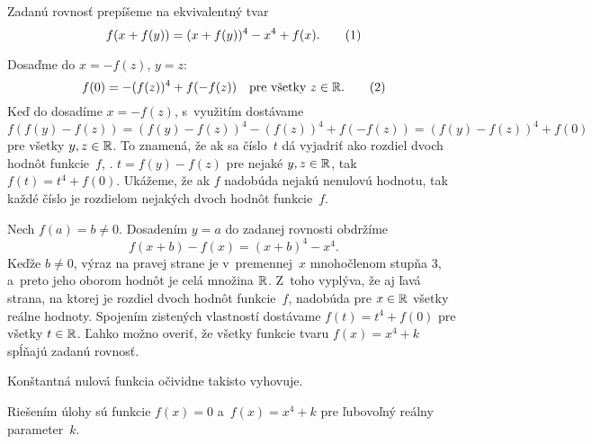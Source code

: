 {%
Zadanú rovnosť prepíšeme na ekvivalentný tvar
$$
f(x+f(y))=(x+f(y))^4-x^4+f(x).\tag1
$$

Dosaďme do  $x=-f(z)$, $y=z$:
$$
f(0)=-(f(z))^4+f(-f(z)) \quad\text{pre všetky $z\in\Bbb R$.}\tag2
$$
Keď do  dosadíme $x=-f(z)$, s~využitím  dostávame
$$
f(f(y)-f(z))=(f(y)-f(z))^4-(f(z))^4+f(-f(z))=(f(y)-f(z))^4+f(0)
$$
pre všetky $y,z\in\Bbb R$. To znamená, že ak sa číslo~$t$ dá vyjadriť ako rozdiel dvoch hodnôt funkcie~$f$, \tj. $t=f(y)-f(z)$ pre nejaké $y,z\in\Bbb R$, tak $f(t)=t^4+f(0)$. Ukážeme, že ak $f$ nadobúda nejakú nenulovú hodnotu, tak každé číslo je rozdielom nejakých dvoch hodnôt funkcie~$f$.

Nech $f(a)=b\ne0$. Dosadením $y=a$ do zadanej rovnosti obdržíme
$$
f(x+b)-f(x)=(x+b)^4-x^4.
$$
Keďže $b\ne 0$, výraz na pravej strane je v~premennej~$x$ mnohočlenom stupňa $3$, a~preto jeho oborom hodnôt je celá množina $\Bbb R$. Z~toho vyplýva, že aj ľavá strana, na ktorej je rozdiel dvoch hodnôt funkcie~$f$, nadobúda pre $x\in\Bbb R$ všetky reálne hodnoty. Spojením zistených vlastností dostávame $f(t)=t^4+f(0)$ pre všetky $t\in\Bbb R$.
Ľahko možno overiť, že všetky funkcie tvaru $f(x)=x^4+k$ spĺňajú zadanú rovnosť.

Konštantná nulová funkcia očividne takisto vyhovuje.

\odpoved
Riešením úlohy sú funkcie $f(x)=0$ a~$f(x)=x^4+k$ pre ľubovoľný reálny parameter~$k$.
}

